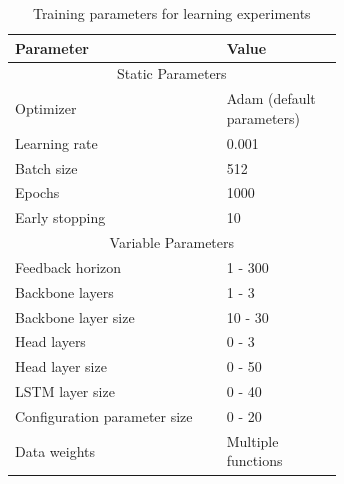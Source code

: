 \begin{table}[h]
    \centering   
    \caption{Training parameters for learning experiments}
    \begin{tabular}{p{0.45\linewidth} | p{0.2\linewidth}}
        \textbf{Parameter} & \textbf{Value} \\
        \hline
        \multicolumn{2}{c}{Static Parameters} \\
        \hline
        Optimizer & Adam (default parameters) \\
        Learning rate & 0.001 \\
        Batch size & 512 \\
        Epochs & 1000 \\
        Early stopping & 10 \\
        \hline
        \multicolumn{2}{c}{Variable Parameters} \\
        \hline
        Feedback horizon & 1 - 300 \\
        Backbone layers & 1 - 3 \\
        Backbone layer size & 10 - 30 \\
        Head layers & 0 - 3 \\
        Head layer size & 0 - 50 \\
        LSTM layer size & 0 - 40 \\
        Configuration parameter size & 0 - 20 \\
        Data weights & Multiple \newline functions \\ 
    \end{tabular}
    \label{tab:training_parameters}
\end{table}

